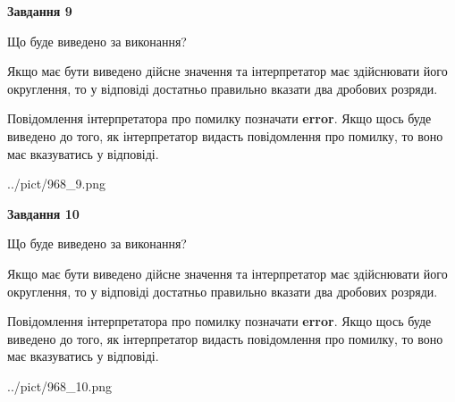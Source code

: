 \documentclass[12pt, ukrainian]{article}
\begin{document}
{\begin {Large}
{\begin {center}\textbf{Завдання 9}\end {center}}\par
Що буде виведено за виконання? \par

Якщо має бути виведено дійсне значення та інтерпретатор має здійснювати його округлення, 
то у відповіді достатньо правильно вказати два дробових розряди.

Повідомлення інтерпретатора про помилку позначати \textbf{error}.
Якщо щось буде виведено до того, як інтерпретатор видасть повідомлення про помилку, 
то воно має вказуватись у відповіді. \par

\begin{center}
	{../pict/968_9.png}
\end{center}
\newpage

{\begin {center}\textbf{Завдання 10}\end {center}}\par
Що буде виведено за виконання? \par

Якщо має бути виведено дійсне значення та інтерпретатор має здійснювати його округлення, 
то у відповіді достатньо правильно вказати два дробових розряди.

Повідомлення інтерпретатора про помилку позначати \textbf{error}.
Якщо щось буде виведено до того, як інтерпретатор видасть повідомлення про помилку, 
то воно має вказуватись у відповіді. \par

\begin{center}
	{../pict/968_10.png}
\end{center}
\newpage

\end {Large}}
\end{document}
